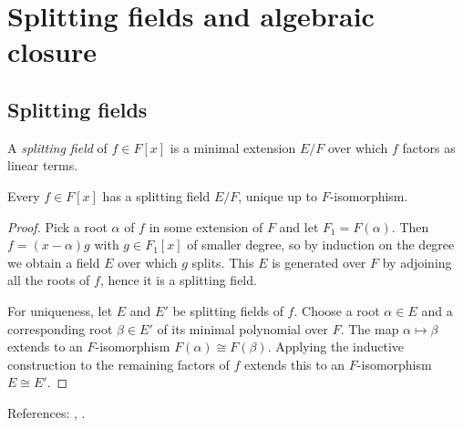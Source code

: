 \section{Splitting fields and algebraic closure}\label{sec:splitting-fields}

\subsection{Splitting fields}
\begin{definition}
A \emph{splitting field} of $f\in F[x]$ is a minimal extension $E/F$ over which $f$ factors as linear terms.
\end{definition}
\begin{theorem}
Every $f\in F[x]$ has a splitting field $E/F$, unique up to $F$-isomorphism.
\end{theorem}
\begin{proof}
Pick a root $\alpha$ of $f$ in some extension of $F$ and let $F_1=F(\alpha)$. Then
\(f=(x-\alpha)g\) with $g\in F_1[x]$ of smaller degree, so by induction on the
degree we obtain a field $E$ over which $g$ splits. This $E$ is generated over
$F$ by adjoining all the roots of $f$, hence it is a splitting field.

For uniqueness, let $E$ and $E'$ be splitting fields of $f$. Choose a root
$\alpha\in E$ and a corresponding root $\beta\in E'$ of its minimal polynomial
over $F$. The map $\alpha\mapsto\beta$ extends to an $F$-isomorphism
$F(\alpha)\cong F(\beta)$. Applying the inductive construction to the remaining
factors of $f$ extends this to an $F$-isomorphism $E\cong E'$.
\end{proof}
References: \cite[\S14]{DF}, \cite[Ch.~V]{Artin}.


